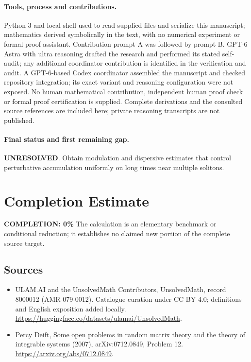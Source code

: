 \documentclass[11pt]{article}
\begin{document}
\paragraph{Tools, process and contributions.}
Python 3 and local shell used to read supplied files and serialize this manuscript; mathematics derived symbolically in the text, with no numerical experiment or formal proof assistant. Contribution prompt A was followed by prompt B. GPT-6 Astra with ultra reasoning drafted the research and performed its stated self-audit; any additional coordinator contribution is identified in the verification and audit. A GPT-6-based Codex coordinator assembled the manuscript and checked repository integration; its exact variant and reasoning configuration were not exposed. No human mathematical contribution, independent human proof check or formal proof certification is supplied. Complete derivations and the consulted source references are included here; private reasoning transcripts are not published.

\paragraph{Final status and first remaining gap.}
\textbf{UNRESOLVED}. Obtain modulation and dispersive estimates that control perturbative accumulation uniformly on long times near multiple solitons.

\section{Completion Estimate}
\noindent\textbf{COMPLETION: 0\%}
The calculation is an elementary benchmark or conditional reduction; it establishes no claimed new portion of the complete source target.

\subsection{Sources}
\begin{itemize}
\item[\hypertarget{source:8000012:1}{S1}] ULAM.AI and the UnsolvedMath Contributors, UnsolvedMath, record 8000012 (AMR-079-0012). Catalogue curation under CC BY 4.0; definitions and English exposition added locally.
\url{https://huggingface.co/datasets/ulamai/UnsolvedMath}.
\item[\hypertarget{source:8000012:2}{S2}] Percy Deift, Some open problems in random matrix theory and the theory of integrable systems (2007), arXiv:0712.0849, Problem 12.
\url{https://arxiv.org/abs/0712.0849}.
\end{itemize}
\label{end:8000012}
\end{document}
